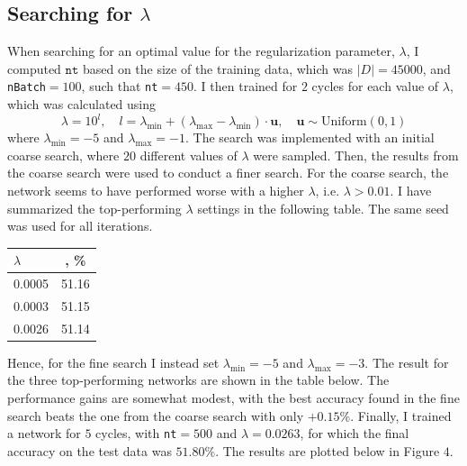 \documentclass{article}
\begin{document}
\subsection*{Searching for $\lambda$}
	When searching for an optimal value for the regularization parameter, $\lambda$, I computed $\texttt{nt}$ based on the size of the training data, which was $\vert D\vert = 45000$, and \texttt{nBatch}$=100$, such that \texttt{nt}$=450$. I then trained for $2$ cycles for each value of $\lambda$, which was calculated using
	$$\lambda = 10^{l}, \quad l = \lambda_{\text{min}} + (\lambda_{\text{max}} - \lambda_{\text{min}}) \cdot \bm{u}, \quad \bm{u}\sim\text{Uniform}(0, 1)$$
	where $\lambda_{\text{min}} = -5$ and $\lambda_{\text{max}} = -1$. The search was implemented with an initial coarse search, where $20$ different values of $\lambda$ were sampled. Then, the results from the coarse search were used to conduct a finer search. For the coarse search, the network seems to have performed worse with a higher $\lambda$, i.e. $\lambda > 0.01$. I have summarized the top-performing $\lambda$ settings in the following table. The same seed was used for all iterations.
	\begin{center}	
	\begin{tabular}{|l|c|}
		\hline
		 $\lambda$ & \text{Accuracy}, \% \\ \hline
		0.0005 & 51.16\\ 
		0.0003 & 51.15\\
		0.0026 & 51.14\\\hline
	\end{tabular}
	\end{center}
	Hence, for the fine search I instead set $\lambda_{\text{min}} = -5$ and $\lambda_{\text{max}} = -3$. The result for the three top-performing networks are shown in the table below. The performance gains are somewhat modest, with the best accuracy found in the fine search beats the one from the coarse search with only $+0.15$\%.  Finally, I trained a network for $5$ cycles, with \texttt{nt}$=500$ and $\lambda=0.0263$, for which the final accuracy on the test data was $51.80$\%. The results are plotted below in Figure $4$.
	
\end{document}
